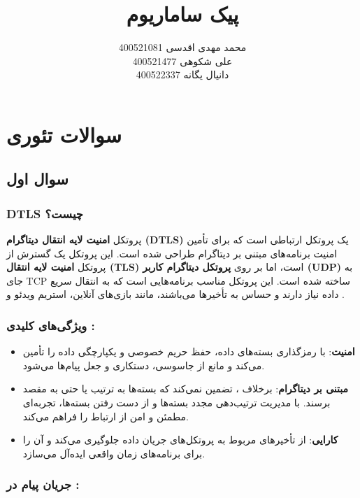 \documentclass{report}
\title{پیک ساماریوم}
\author{
محمد مهدی اقدسی 400521081 \\
علی شکوهی 400521477 \\
دانیال یگانه 400522337
}
\begin{document}
\Godpage
{}

\maketitle
{}
\tableofcontents

\chapter{سوالات تئوری}
\section{سوال اول}

\subsection*{DTLS چیست؟}
پروتکل \textbf{امنیت لایه انتقال دیتاگرام (DTLS)} یک پروتکل ارتباطی است که برای تأمین امنیت برنامه‌های مبتنی بر دیتاگرام طراحی شده است. این پروتکل یک گسترش از پروتکل \textbf{امنیت لایه انتقال (TLS)} است، اما بر روی \textbf{پروتکل دیتاگرام کاربر (UDP)} به جای TCP ساخته شده است. این پروتکل مناسب برنامه‌هایی است که به انتقال سریع داده نیاز دارند و حساس به تأخیرها می‌باشند، مانند بازی‌های آنلاین، استریم ویدئو و .
	
\subsection*{ویژگی‌های کلیدی :}
\begin{itemize}
	\item \textbf{امنیت}:
	 با رمزگذاری بسته‌های داده، حفظ حریم خصوصی و یکپارچگی داده را تأمین می‌کند و مانع از جاسوسی، دستکاری و جعل پیام‌ها می‌شود.
	\item \textbf{مبتنی بر دیتاگرام}:
	 برخلاف ،  تضمین نمی‌کند که بسته‌ها به ترتیب یا حتی به مقصد برسند.  با مدیریت ترتیب‌دهی مجدد بسته‌ها و از دست رفتن بسته‌ها، تجربه‌ای مطمئن و امن از ارتباط را فراهم می‌کند.
	\item \textbf{کارایی}:
	از تأخیرهای مربوط به پروتکل‌های جریان داده جلوگیری می‌کند و آن را برای برنامه‌های زمان واقعی ایده‌آل می‌سازد.
\end{itemize}

\subsection*{جریان پیام در :}
\end{document}
